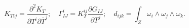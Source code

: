 \begin{equation}
K_{Tij} = \frac{ \partial^{2} K_{T} }
                  { \partial T^{i} \partial \overline{T}^{j} }; \quad
\Gamma^{i}_{IJ} =  K^{ij}_{T} \frac{ \partial G_{IJ} }{ \partial T^{j} };
\quad
d_{ijk} = \int_{Z} \omega_{i} \wedge \omega_{j} \wedge \omega_{k}.
\end{equation}


